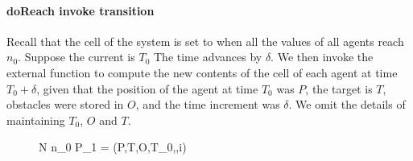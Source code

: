 \paragraph{doReach invoke transition} Recall that the  cell of the system is set to  when all the  values of all agents reach $n_0$. Suppose the current  is $T_0$ The time advances by $\delta$. We then invoke the external function  to compute the new contents of the  cell of each agent at time $T_0 +\delta$, given that the position of the agent at time $T_0$ was $P$, the target  is $T$, obstacles were stored in $O$, and the time increment was $\delta$. We omit the details of maintaining $T_0$, $O$ and $T$.
\begin{figure}
\label{fig:lock1}
{N  n_0  P_{1} = (P,T,O,T_0,\delta,i)}{}{}{}
\end{figure}


